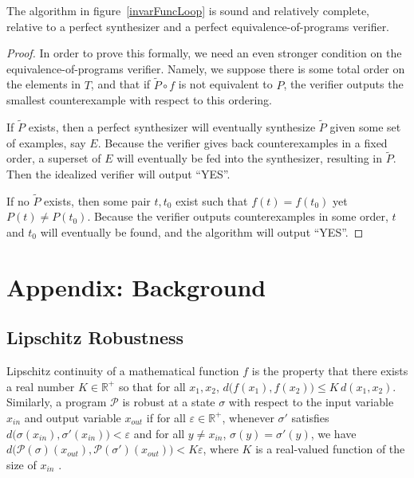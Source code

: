 \documentclass{llncs}
\begin{document}
  \begin{theorem}
    The algorithm in figure~\ref{invarFuncLoop} is sound and relatively complete,
    relative to a perfect synthesizer and a perfect equivalence-of-programs
    verifier.
  \end{theorem}
  \begin{proof}
    In order to prove this formally, we need an even stronger condition on the
    equivalence-of-programs verifier.
    Namely, we suppose there is some total order on the elements in $T$,
    and that if $\widetilde{P}\circ f$ is not equivalent to $P$,
    the verifier outputs the smallest counterexample with respect to this
    ordering.

    If $\widetilde{P}$ exists, then a perfect synthesizer will eventually
    synthesize $\widetilde{P}$ given some set of examples, say $E$.
    Because the verifier gives back counterexamples in a fixed order,
    a superset of $E$ will eventually be fed into the synthesizer,
    resulting in $\widetilde{P}$.
    Then the idealized verifier will output ``YES''.

    If no $\widetilde{P}$ exists, then some pair $t, t_0$ exist
    such that $f(t)=f(t_0)$ yet $P(t)\ne P(t_0)$.
    Because the verifier outputs counterexamples in some order,
    $t$ and $t_0$ will eventually be found, and the algorithm will output ``YES''.
  \end{proof}

\appendix

\section{Appendix: Background}

  \subsection{Lipschitz Robustness}

    Lipschitz continuity of a mathematical function \(f\) is the property that there
    exists a real number \(K \in \mathbb{R}^{+}\) so that for all \(x_{1}, x_{2}\),
    \(d\big(f(x_{1}), f(x_{2})\big) \leq K\,d(x_{1}, x_{2})\).  Similarly, a program
    \(\mathcal{P}\) is robust at a state \(\sigma\)  with respect to the input
    variable \(x_{in}\) and output variable \(x_{out}\) if for all \(\varepsilon \in
    \mathbb{R}^{+}\), whenever \(\sigma'\) satisfies
    \(d\big(\sigma(x_{in}), \sigma'(x_{in})\big) < \varepsilon\) and
    for all \(y \not= x_{in}\), \(\sigma(y) = \sigma'(y)\),
    we have \(d\big(\mathcal{P}(\sigma)(x_{out}), \mathcal{P}(\sigma')(x_{out})\big) < K\varepsilon\),
    where \(K\) is a real-valued function of the size of \(x_{in}\)
    \cite{chaudhuri11}.
\end{document}
